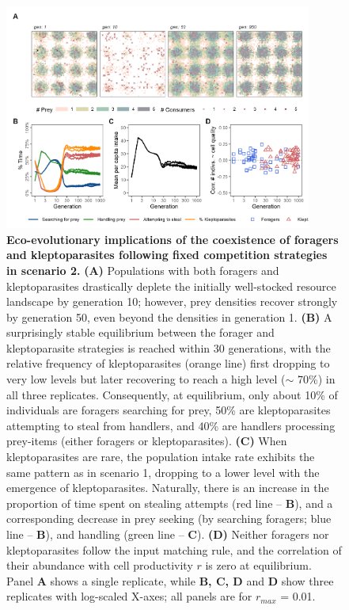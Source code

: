 \begin{figure}[t!]
    \centering
    \includegraphics[width=0.9\textwidth]{figures/kleptomove/fig_02.png}
    \caption{
        \textbf{Eco-evolutionary implications of the coexistence of foragers and kleptoparasites following fixed competition strategies in scenario 2.}
        \textbf{(A)} Populations with both foragers and kleptoparasites drastically deplete the initially well-stocked resource landscape by generation 10; however, prey densities recover strongly by generation 50, even beyond the densities in generation 1.
        \textbf{(B)} A surprisingly stable equilibrium between the forager and kleptoparasite strategies is reached within 30 generations, with the relative frequency of kleptoparasites (orange line) first dropping to very low levels but later recovering to reach a high level ($\sim$ 70\%) in all three replicates.
        Consequently, at equilibrium, only about 10\% of individuals are foragers searching for prey, 50\% are kleptoparasites attempting to steal from handlers, and 40\% are handlers processing prey-items (either foragers or kleptoparasites). 
        \textbf{(C)} When kleptoparasites are rare, the population intake rate exhibits the same pattern as in scenario 1, dropping to a lower level with the emergence of kleptoparasites.
        Naturally, there is an increase in the proportion of time spent on stealing attempts (red line -- \textbf{B}), and a corresponding decrease in prey seeking (by searching foragers; blue line -- \textbf{B}), and handling (green line -- \textbf{C}).
        \textbf{(D)} Neither foragers nor kleptoparasites follow the input matching rule, and the correlation of their abundance with cell productivity $r$ is zero at equilibrium.
        Panel \textbf{A} shows a single replicate, while \textbf{B, C, D} and \textbf{D} show three replicates with log-scaled X-axes; all panels are for $r_{max}$ = 0.01.
    }
    \label{klepto_fig_02}
\end{figure}

